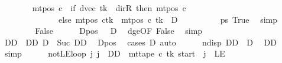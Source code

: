 \begin{isabellebody}
\ \ \ \ \ \ \isamarkupfalse%
\ {\isachardoublequoteopen}mt{\isacharunderscore}{\kern0pt}pos\ c{\isacharprime}{\kern0pt}\ {\isacharequal}{\kern0pt}\ {\isacharparenleft}{\kern0pt}if\ dvec\ tk\ {\isacharequal}{\kern0pt}\ dir{\isachardot}{\kern0pt}R\ then\ mt{\isacharunderscore}{\kern0pt}pos\ c{}\isanewline
\ \ \ \ \ \ \ \ \ \ \ \ \ \ else\ {\isacharparenleft}{\kern0pt}mt{\isacharunderscore}{\kern0pt}pos\ c{}{\isacharparenright}{\kern0pt}{\isacharparenleft}{\kern0pt}tk\ {\isacharcolon}{\kern0pt}{\isacharequal}{\kern0pt}\ mt{\isacharunderscore}{\kern0pt}pos\ c{}\ tk\ {\isacharminus}{\kern0pt}\ {\isacharquery}{\kern0pt}D{\isacharparenright}{\kern0pt}{\isacharparenright}{\kern0pt}{\isachardoublequoteclose}\isanewline
\ \ \ \ \ \ \ \ \isamarkupfalse%
\ ps\ True\ \isamarkupfalse%
\ simp\isanewline
\ \ \ \ \isamarkupfalse%
\isanewline
\ \ \isamarkupfalse%
\isanewline
\ \ \ \ \isamarkupfalse%
\ False\isanewline
\ \ \ \ \isamarkupfalse%
\ Dpos{\isacharcolon}{\kern0pt}\ {\isachardoublequoteopen}{}\ {\isacharless}{\kern0pt}\ {\isacharquery}{\kern0pt}D{\isachardoublequoteclose}\ \isamarkupfalse%
\ dge{}{\isacharbrackleft}{\kern0pt}OF\ False{\isacharbrackright}{\kern0pt}\ \isamarkupfalse%
\ simp\isanewline
\ \ \ \ \isamarkupfalse%
\ DD\ \ DD{\isacharcolon}{\kern0pt}\ {\isachardoublequoteopen}{\isacharquery}{\kern0pt}D\ {\isacharequal}{\kern0pt}\ Suc\ DD{\isachardoublequoteclose}\ \isamarkupfalse%
\ Dpos\ \isamarkupfalse%
\ {\isacharparenleft}{\kern0pt}cases\ {\isacharquery}{\kern0pt}D{\isacharparenright}{\kern0pt}\ auto\isanewline
\ \ \ \ \isamarkupfalse%
\ ndisp{\isacharcolon}{\kern0pt}\ {\isachardoublequoteopen}DD\ {\isacharless}{\kern0pt}\ {\isacharquery}{\kern0pt}D{\isachardoublequoteclose}\ \isamarkupfalse%
\ DD\ \isamarkupfalse%
\ simp\isanewline
\ \ \ \ \isamarkupfalse%
\ notLE{\isacharunderscore}{\kern0pt}loop{\isacharcolon}{\kern0pt}\ {\isachardoublequoteopen}{\isasymAnd}j{\isachardot}{\kern0pt}\ j\ {\isacharless}{\kern0pt}\ DD\ {\isasymLongrightarrow}\ mt{\isacharunderscore}{\kern0pt}tape\ c{}\ tk\ {\isacharparenleft}{\kern0pt}{\isacharquery}{\kern0pt}start\ {\isacharminus}{\kern0pt}\ j{\isacharparenright}{\kern0pt}\ {\isasymnoteq}\ LE{}{\isachardoublequoteclose}\isanewline

\end{isabellebody}
